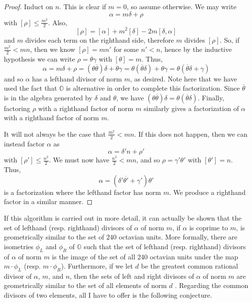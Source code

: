 \documentclass[10pt]{amsart}
\renewcommand{\O}{\mathbb{O}}
\renewcommand{\bar}{\overline}
\newcommand{\norm}[1]{\left[#1\right]}
\begin{document}
\begin{proof}
Induct on $n$.  This is clear if $m=0$, so assume otherwise.  We may write
$$
\alpha = m\delta + \rho
$$
with $\norm{\rho} \leq \frac{m^2}{2}$.  Also,
$$
\norm{\rho} = \norm{\alpha} + m^2\norm{\delta} - 2m\norm{\delta, \alpha}
$$
and $m$ divides each term on the righthand side, therefore $m$ divides $\norm{\rho}$.  So, if $\frac{m^2}{2} < mn$, then we know $\norm{\rho} = mn'$ for some $n' < n$, hence by the inductive hypothesis we can write $\rho = \theta \gamma$ with $\norm{\theta} = m$.  Thus,
$$
\alpha = m\delta + \rho = (\theta \bar{\theta})\delta + \theta \gamma = \theta(\bar{\theta}\delta) + \theta \gamma = \theta(\bar{\theta}\delta + \gamma)
$$
and so $\alpha$ has a lefthand divisor of norm $m$, as desired.  Note here that we have used the fact that $\O$ is alternative in order to complete this factorization.  Since $\bar{\theta}$ is in the algebra generated by $\delta$ and $\theta$, we have $(\theta \bar{\theta})\delta = \theta(\bar{\theta}\delta)$.  Finally, factoring $\rho$ with a righthand factor of norm $m$ similarly gives a factorization of $\alpha$ with a righthand factor of norm $m$.

It will not always be the case that $\frac{m^2}{2} < mn$.  If this does not happen, then we can instead factor $\alpha$ as
$$
\alpha = \delta'n + \rho'
$$
with $\norm{\rho'} \leq \frac{n^2}{2}$.  We must now have $\frac{n^2}{2} < mn$, and so $\rho = \gamma ' \theta '$ with $\norm{\theta'} = n$.  Thus,
$$
\alpha = (\delta' \bar{\theta'} + \gamma') \theta'
$$
is a factorization where the lefthand factor has norm $m$.  We produce a righthand factor in a similar manner.
\end{proof}

If this algorithm is carried out in more detail, it can actually be shown that the set of lefthand (resp. righthand) divisors of $\alpha$ of norm $m$, if $\alpha$ is coprime to $m$, is geometrically similar to the set of $240$ octavian units.  More formally, there are isometries $\phi_L$ and $\phi_R$ of $\O$ such that the set of lefthand (resp. righthand) divisors of $\alpha$ of norm $m$ is the image of the set of all 240 octavian units under the map $m \cdot \phi_L$ (resp. $m\cdot \phi_R$).  Furthermore, if we let $d$ be the greatest common rational divisor of $\alpha$, $m$, and $n$, then the sets of left and right divisors of $\alpha$ of norm $m$ are geometrically similar to the set of all elements of norm $d$ \cite{Co03}.  Regarding the common divisors of two elements, all I have to offer is the following conjecture.
\end{document}

